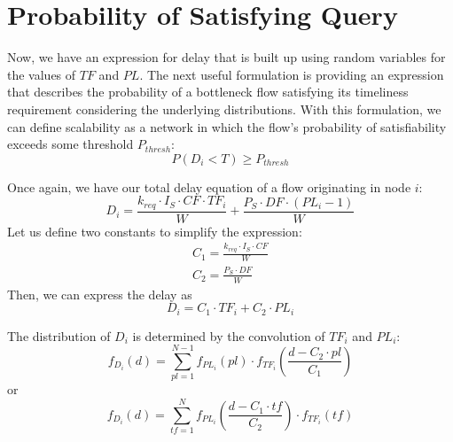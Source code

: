 \section{Probability of Satisfying Query}
\label{sec:prob_sat}

Now, we have an expression for delay that is built up using random variables for the values of $TF$ and $PL$.  The next useful formulation is providing an expression that describes the probability of a bottleneck flow satisfying its timeliness requirement considering the underlying distributions.  With this formulation, we can define scalability as a network in which the flow's probability of satisfiability exceeds some threshold $P_{thresh}$:
\begin{equation}
	P(D_i < T) \geq P_{thresh}
\label{eq:scal_definition}
\end{equation}

Once again, we have our total delay equation of a flow originating in node $i$:
\begin{equation}
	D_i = \frac{ k_{req} \cdot I_S \cdot CF \cdot TF_i}{W} + \frac{P_S \cdot DF \cdot (PL_i-1)}{W}
\end{equation}
Let us define two constants to simplify the expression:
\begin{eqnarray*}
	C_1 = \frac{k_{req} \cdot I_S \cdot CF}{W} \\
	C_2 = \frac{P_S \cdot DF}{W}
\end{eqnarray*}
Then, we can express the delay as
\begin{equation}
	D_i = C_1 \cdot TF_i + C_2 \cdot PL_i
\end{equation}

The distribution of $D_i$ is determined by the convolution of $TF_i$ and $PL_i$:
\begin{equation}
	f_{D_i}(d) = \sum\limits_{pl=1}^{N-1} f_{PL_i}(pl) \cdot f_{TF_i}(\frac{d - C_2 \cdot pl}{C_1})
\label{eq:pdf_d_1}
\end{equation}
or
\begin{equation}
	f_{D_i}(d) = \sum\limits_{tf=1}^{N} f_{PL_i}(\frac{d - C_1 \cdot tf}{C_2}) \cdot f_{TF_i}(tf)
\label{eq:pdf_d_2}
\end{equation}

